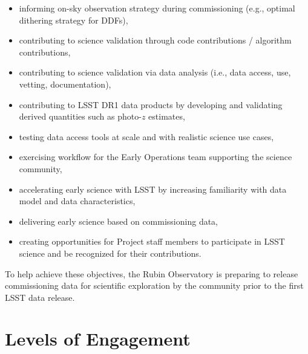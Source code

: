 \documentclass[SE,authoryear,toc]{lsstdoc}
\begin{document}
\begin{itemize}
\item informing on-sky observation strategy during commissioning (e.g., optimal dithering strategy for DDFs),
\item contributing to science validation through code contributions / algorithm contributions,
\item contributing to science validation via data analysis (i.e., data access, use, vetting, documentation),
\item contributing to LSST DR1 data products by developing and validating derived quantities such as photo-$z$ estimates,
\item testing data access tools at scale and with realistic science use cases,
\item exercising workflow for the Early Operations team supporting the science community,
\item accelerating early science with LSST by increasing familiarity with data model and data characteristics,
\item delivering early science based on commissioning data,
\item creating opportunities for Project staff members to participate in LSST science and be recognized for their contributions.
\end{itemize}

To help achieve these objectives, the Rubin Observatory is preparing to release commissioning data for scientific exploration by the community prior to the first LSST data release.

\section{Levels of Engagement}
\end{document}
